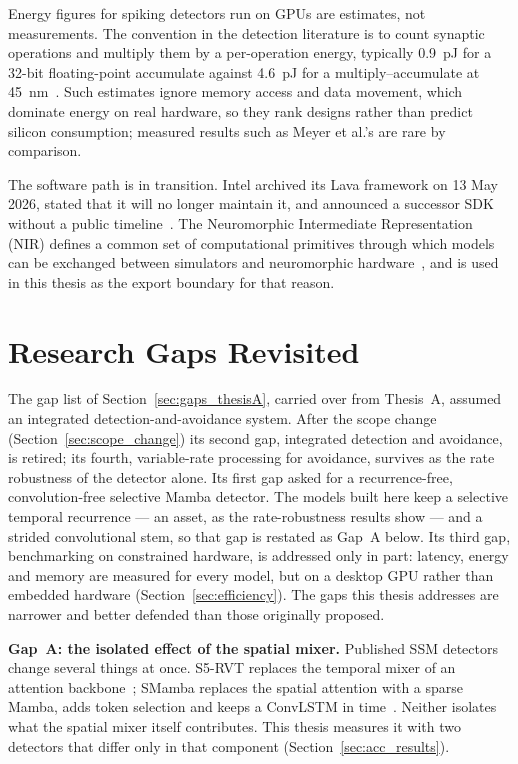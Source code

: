 \documentclass[11pt, a4paper]{report}
\begin{document}
Energy figures for spiking detectors run on GPUs are estimates, not measurements. The convention in the
detection literature is to count synaptic operations and multiply them by a per-operation energy, typically
0.9~pJ for a 32-bit floating-point accumulate against 4.6~pJ for a multiply--accumulate at
45~nm~\cite{horowitz2014computing,su2023deep,luo2024integer}. Such estimates ignore memory access and data
movement, which dominate energy on real hardware, so they rank designs rather than predict silicon
consumption; measured results such as Meyer et al.'s are rare by comparison.

The software path is in transition. Intel archived its Lava framework on 13 May 2026, stated that it will
no longer maintain it, and announced a successor SDK without a public timeline~\cite{intel2026lava}. The
Neuromorphic Intermediate Representation (NIR) defines a common set of computational primitives through
which models can be exchanged between simulators and neuromorphic hardware~\cite{pedersen2024neuromorphic},
and is used in this thesis as the export boundary for that reason.

\section{Research Gaps Revisited}
\label{sec:gaps_revisited}
The gap list of Section~\ref{sec:gaps_thesisA}, carried over from Thesis~A, assumed an integrated
detection-and-avoidance system. After the scope change (Section~\ref{sec:scope_change}) its second gap,
integrated detection and avoidance, is retired; its fourth, variable-rate processing for avoidance,
survives as the rate robustness of the detector alone. Its first gap asked for a recurrence-free,
convolution-free selective Mamba detector. The models built here keep a selective temporal recurrence ---
an asset, as the rate-robustness results show --- and a strided convolutional stem, so that gap is
restated as Gap~A below. Its third gap, benchmarking on constrained hardware, is addressed only in part:
latency, energy and memory are measured for every model, but on a desktop GPU rather than embedded
hardware (Section~\ref{sec:efficiency}). The gaps this thesis addresses are narrower
and better defended than those originally proposed.

\textbf{Gap~A: the isolated effect of the spatial mixer.} Published SSM detectors change several things at
once. S5-RVT replaces the temporal mixer of an attention backbone~\cite{zubic2024state}; SMamba replaces the
spatial attention with a sparse Mamba, adds token selection and keeps a ConvLSTM in
time~\cite{yang2025smamba}. Neither isolates what the spatial mixer itself contributes. This thesis
measures it with two detectors that differ only in that component (Section~\ref{sec:acc_results}).
\end{document}
